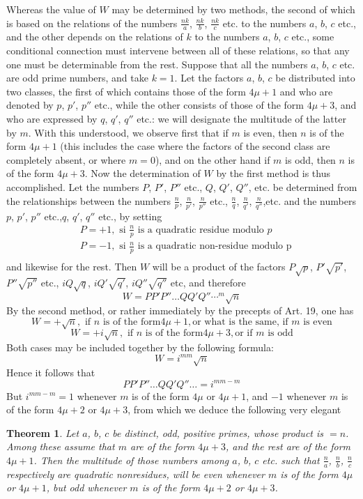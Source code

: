 \documentclass{book}
\theoremstyle{plain}
\newtheorem*{theorem}{Theorem}
\theoremstyle{remark}
\begin{document}
Whereas the value of $W$ may be determined by two methods, the second of which is based on the relations of the numbers $\frac{nk}{a}$, $\frac{nk}{b}$, $\frac{nk}{c}$ etc. to the numbers $a$, $b$, $c$ etc., and the other depends on the relations of $k$ to the numbers $a$, $b$, $c$ etc., some conditional connection must intervene between all of these relations, so that any one must be determinable from the rest.  Suppose that all the numbers $a$, $b$, $c$ etc. are odd prime numbers, and take $k=1$.  Let the factors $a$, $b$, $c$ be distributed into two classes, the first of which contains those of the form $4\mu+1$ and who are denoted by $p$, $p'$, $p''$ etc., while the other consists of those of the form $4\mu+3$, and who are expressed by $q$, $q'$, $q''$ etc.: we will designate the multitude of the latter by $m$.  With this understood, we observe first that if $m$ is even, then $n$ is of the form $4\mu+1$ (this includes the case where the factors of the second class are completely absent, or where $m = 0$), and on the other hand if $m$ is odd, then $n$ is of the form $4\mu+3$.  Now the determination of $W$ by the first method is thus accomplished.  Let the numbers $P$, $P'$, $P''$ etc., $Q$, $Q'$, $Q''$, etc. be determined from the relationships between the numbers $\frac{n}{p}$, $\frac{n}{p'}$, $\frac{n}{p''}$ etc., $\frac{n}{q}$, $\frac{n}{q'}$, $\frac{n}{q''}$,etc. and the numbers $p$, $p'$, $p''$ etc.,$q$, $q'$, $q''$ etc., by setting 
\begin{align*}
& P = +1, \textrm{ si }\frac{n}{p}\textrm{ is a quadratic residue modulo }p \\
& P = -1, \textrm{ si } \frac{n}{p}\textrm{ is a quadratic non-residue modulo p}\\
\end{align*}
and likewise for the rest.  Then $W$ will be a product of the factors $P\sqrt{p}$, $P'\sqrt{p'}$, $P''\sqrt{p''}$ etc., $iQ\sqrt{q}$, $iQ'\sqrt{q'}$, $iQ''\sqrt{q''}$ etc, and therefore 
\[ W = PP'P''\dots QQ'Q''\dotsi^m \sqrt{n} \]
By the second method, or rather immediately by the precepts of Art. 19, one has
\[ W = +\sqrt{n}, \textrm{ if }n\textrm{ is of the form}4\mu+1,\textrm{or what is the same, if }m\textrm{ is even}\]
\[ W = +i\sqrt{n}, \textrm{ if }n\textrm{ is of the form}4\mu+3,\textrm{or if }m\textrm{ is odd} \]
Both cases may be included together by the following formula:
\[W = i^{mm}\sqrt{n} \]
Hence it follows that
\[ PP'P'' \dots Q Q' Q'' \dots = i^{mm-m} \]
But $i^{mm-m}=1$ whenever $m$ is of the form $4\mu$ or $4\mu+1$, and $-1$ whenever $m$ is of the form $4\mu+2$ or $4\mu+3$, from which we deduce the following very elegant 
\begin{theorem} Let $a$, $b$, $c$ be distinct, odd, positive primes, whose product is $= n$.  Among these assume that $m$ are of the form $4\mu+3$, and the rest are of the form $4\mu+1$.   Then the multitude of those numbers among $a$, $b$, $c$ etc. such that $\frac{n}{a}$, $\frac{n}{b}$, $\frac{n}{c}$ respectively are quadratic nonresidues, will be even whenever $m$ is of the form $4\mu$ or $4\mu+1$, but odd whenever $m$ is of the form $4\mu+2$ or $4\mu+3$.  \end{theorem}
\end{document}
